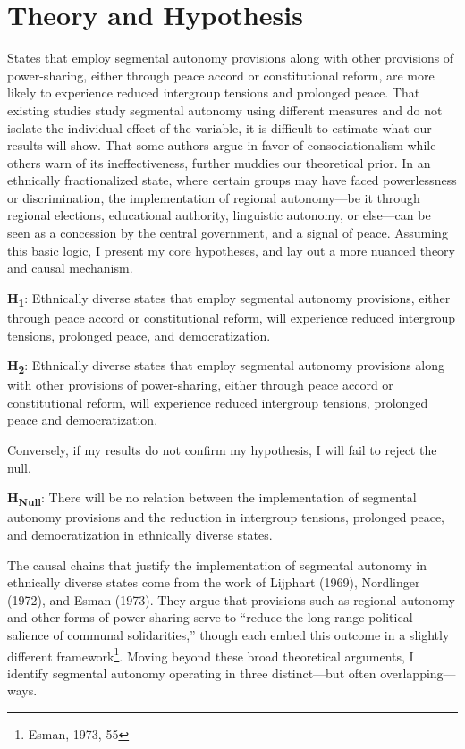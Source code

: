 \documentclass[12pt]{article}
\begin{document}
\section{Theory and Hypothesis}
States that employ segmental autonomy provisions along with other provisions of power-sharing, either through peace accord or constitutional reform, are more likely to experience reduced intergroup tensions and prolonged peace. That existing studies study segmental autonomy using different measures and do not isolate the individual effect of the variable, it is difficult to estimate what our results will show. That some authors argue in favor of consociationalism while others warn of its ineffectiveness, further muddies our theoretical prior. In an ethnically fractionalized state, where certain groups may have faced powerlessness or discrimination, the implementation of regional autonomy---be it through regional elections, educational authority, linguistic autonomy, or else---can be seen as a concession by the central government, and a signal of peace. Assuming this basic logic, I present my core hypotheses, and lay out a more nuanced theory and causal mechanism. 

\singlespacing

\textbf{H\textsubscript{1}}: Ethnically diverse states that employ segmental autonomy provisions, either through peace accord or constitutional reform, will experience reduced intergroup tensions, prolonged peace, and democratization.

\bigskip

\textbf{H\textsubscript{2}}: Ethnically diverse states that employ segmental autonomy provisions along with other provisions of power-sharing, either through peace accord or constitutional reform, will experience reduced intergroup tensions, prolonged peace and democratization. 

\doublespacing

Conversely, if my results do not confirm my hypothesis, I will fail to reject the null. 

\singlespacing

\textbf{H\textsubscript{Null}}: There will be no relation between the implementation of segmental autonomy provisions and the reduction in intergroup tensions, prolonged peace, and democratization in ethnically diverse states. 

\doublespacing

The causal chains that justify the implementation of segmental autonomy in ethnically diverse states come from the work of Lijphart (1969), Nordlinger (1972), and Esman (1973). They argue that provisions such as regional autonomy and other forms of power-sharing serve to “reduce the long-range political salience of communal solidarities,” though each embed this outcome in a slightly different framework\footnote{Esman, 1973, 55}. Moving beyond these broad theoretical arguments, I identify segmental autonomy operating in three distinct---but often overlapping---ways. 
\end{document}
